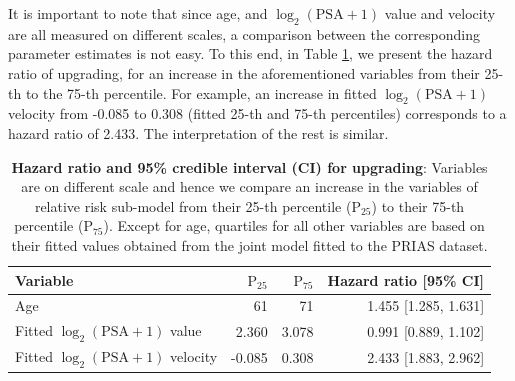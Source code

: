 It is important to note that since age, and ${\log_2 (\mbox{PSA} + 1)}$ value and velocity are all measured on different scales, a comparison between the corresponding parameter estimates is not easy. To this end, in Table \ref{tab:PSA_survival_easy}, we present the hazard ratio of upgrading, for an increase in the aforementioned variables from their 25-th to the 75-th percentile. For example, an increase in fitted $\log_2 (\mbox{PSA} + 1)$ velocity from -0.085 to 0.308 (fitted 25-th and 75-th percentiles) corresponds to a hazard ratio of 2.433. The interpretation of the rest is similar.

\begin{table}
\small\sf\centering
\caption{\textbf{Hazard ratio and 95\% credible interval (CI) for upgrading}: Variables are on different scale and hence we compare an increase in the variables of relative risk sub-model from their 25-th percentile ($\mbox{P}_{25}$) to their 75-th percentile ($\mbox{P}_{75}$). Except for age, quartiles for all other variables are based on their fitted values obtained from the joint model fitted to the PRIAS dataset.}
\label{tab:PSA_survival_easy}
\begin{tabular}{lrrr}
\hline
Variable                      & $\mbox{P}_{25}$   & $\mbox{P}_{75}$ & Hazard ratio [95\% CI] \\
\hline
Age & 61 & 71 & 1.455 [1.285, 1.631] \\
Fitted $\log_2 (\mbox{PSA} + 1)$ value & 2.360 & 3.078 & 0.991 [0.889, 1.102] \\
Fitted $\log_2 (\mbox{PSA} + 1)$ velocity & -0.085 & 0.308 & 2.433 [1.883, 2.962] \\
\hline
\end{tabular}
\end{table}

